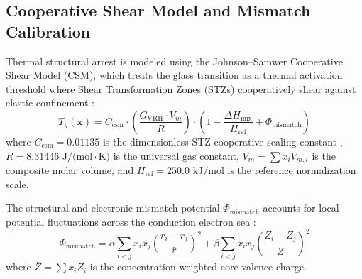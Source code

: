 \documentclass[aps,prmaterials,reprint,superscriptaddress,amsmath,amssymb,floatfix]{revtex4-2}
\begin{document}
\subsection{Cooperative Shear Model and Mismatch Calibration}
Thermal structural arrest is modeled using the Johnson--Samwer Cooperative Shear Model (CSM), which treats the glass transition as a thermal activation threshold where Shear Transformation Zones (STZs) cooperatively shear against elastic confinement \cite{Johnson2005}:
\begin{equation}
T_g(\mathbf{x}) = C_{\text{csm}} \cdot \left( \frac{G_{\text{VRH}} \cdot V_m}{R} \right) \cdot \left( 1 - \frac{\Delta H_{\text{mix}}}{H_{\text{ref}}} + \Phi_{\text{mismatch}} \right)
\label{eq:csm}
\end{equation}
where $C_{\text{csm}} = 0.01135$ is the dimensionless STZ cooperative scaling constant \cite{Johnson2005}, $R = 8.31446\text{ J/(mol}\cdot\text{K)}$ is the universal gas constant, $V_m = \sum x_i V_{m,i}$ is the composite molar volume, and $H_{\text{ref}} = 250.0\text{ kJ/mol}$ is the reference normalization scale.

The structural and electronic mismatch potential $\Phi_{\text{mismatch}}$ accounts for local potential fluctuations across the conduction electron sea \cite{AshcroftMermin,Miedema1988,Egami1984,Trelewicz2016}:
\begin{equation}
\Phi_{\text{mismatch}} = \alpha \sum_{i<j} x_i x_j \left( \frac{r_i - r_j}{\bar{r}} \right)^2 + \beta \sum_{i<j} x_i x_j \left( \frac{Z_i - Z_j}{\bar{Z}} \right)^2
\label{eq:mismatch}
\end{equation}
where $\bar{Z} = \sum x_i Z_i$ is the concentration-weighted core valence charge.
\end{document}
